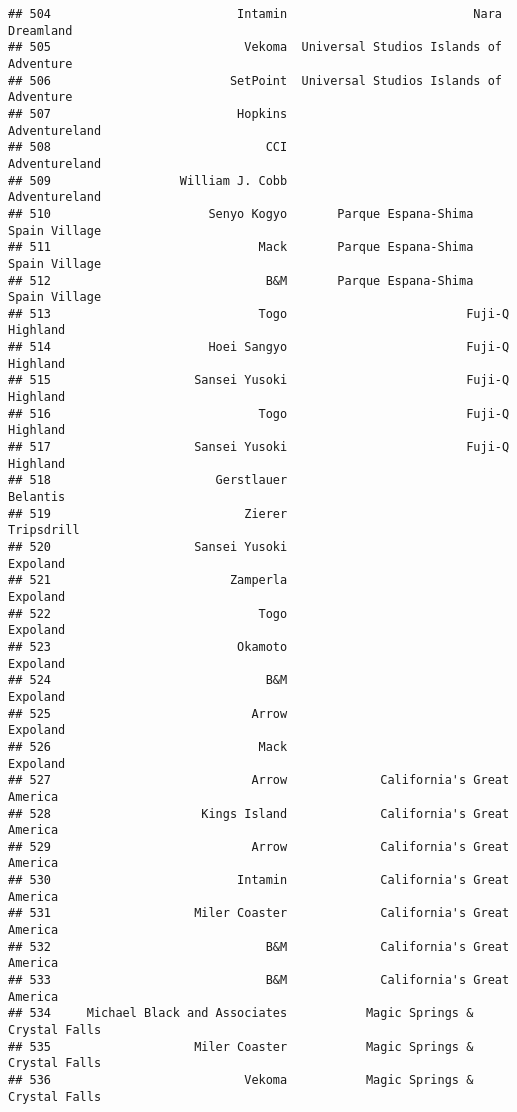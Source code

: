 \documentclass[
]{article}
\begin{document}
\begin{verbatim}
## 504                          Intamin                          Nara Dreamland
## 505                           Vekoma  Universal Studios Islands of Adventure
## 506                         SetPoint  Universal Studios Islands of Adventure
## 507                          Hopkins                           Adventureland
## 508                              CCI                           Adventureland
## 509                  William J. Cobb                           Adventureland
## 510                      Senyo Kogyo       Parque Espana-Shima Spain Village
## 511                             Mack       Parque Espana-Shima Spain Village
## 512                              B&M       Parque Espana-Shima Spain Village
## 513                             Togo                         Fuji-Q Highland
## 514                      Hoei Sangyo                         Fuji-Q Highland
## 515                    Sansei Yusoki                         Fuji-Q Highland
## 516                             Togo                         Fuji-Q Highland
## 517                    Sansei Yusoki                         Fuji-Q Highland
## 518                       Gerstlauer                                Belantis
## 519                           Zierer                              Tripsdrill
## 520                    Sansei Yusoki                                Expoland
## 521                         Zamperla                                Expoland
## 522                             Togo                                Expoland
## 523                          Okamoto                                Expoland
## 524                              B&M                                Expoland
## 525                            Arrow                                Expoland
## 526                             Mack                                Expoland
## 527                            Arrow             California's Great America 
## 528                     Kings Island             California's Great America 
## 529                            Arrow             California's Great America 
## 530                          Intamin             California's Great America 
## 531                    Miler Coaster             California's Great America 
## 532                              B&M             California's Great America 
## 533                              B&M             California's Great America 
## 534     Michael Black and Associates           Magic Springs & Crystal Falls
## 535                    Miler Coaster           Magic Springs & Crystal Falls
## 536                           Vekoma           Magic Springs & Crystal Falls

\end{verbatim}
\end{document}
